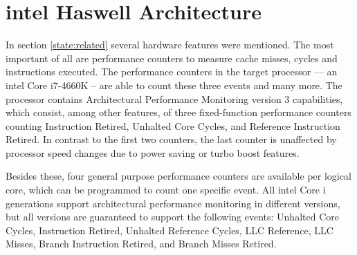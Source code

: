 \begin{comment}
\textbf{Fiasco.OC}
\begin{itemize}
  \item Kernel scheduler does no balancing, assigns thread to the first
    core specified in the affinity descriptor
  \item affinity descriptor: core(s) a thread should run on
  \item Syscall via run\_thread() to pass affinity descr to kernel scheduler
  \item interface to query execution time for each thread
  \item capability system -- to derive communication relationships from
  \item	Kernel feature wishes derived from related work: Performance counters
    and per thread accounting
\end{itemize}

\textbf{L4Re}
\begin{itemize}
  \item provides scheduler proxy interface, including affinity descriptor,
    scheduling parameters
  \item syscall interface
\end{itemize}
\end{comment}



\section{\gls{intel} Haswell Architecture}
\label{state:haswell}

In section \ref{state:related} several hardware features were mentioned.
The most important of all are performance counters to measure cache misses, cycles and
instructions executed.
The performance counters in the target processor --- an \gls{intel} Core
i7-4660K -- are able to count these three events and many more.
The processor contains Architectural Performance Monitoring version 3
capabilities, which consist, among other features, of three fixed-function
performance counters counting Instruction Retired, Unhalted Core Cycles, and
Reference Instruction Retired.
In contrast to the first two counters, the last counter is unaffected by
processor speed changes due to power saving or turbo boost features.

Besides these, four general purpose performance counters are available per
logical core, which can be programmed to count one specific event.
All \gls{intel} Core i generations support architectural performance monitoring
in different versions, but all versions are guaranteed to support the following
events:
Unhalted Core Cycles, Instruction Retired, Unhalted Reference Cycles,
LLC Reference, LLC Misses, Branch Instruction Retired,
and Branch Misses Retired.

